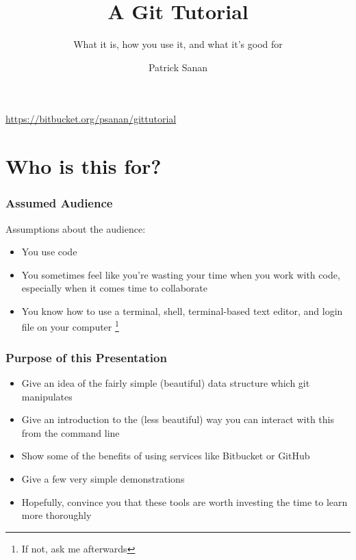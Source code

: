\documentclass{beamer}
\author{Patrick Sanan}
\institute[USI/ETHZ] 
{
USI Lugano ICS / ETH Z\"{u}rich D-ERDW\\
}
\title{A Git Tutorial}
\subtitle[]{What it is, how you use it, and what it's good for}
\date[]{}
\begin{document}

\begin{frame}[fragile]
\titlepage 
\begin{center}
\href{https://bitbucket.org/psanan/gittutorial}{https://bitbucket.org/psanan/gittutorial}
\end{center}
\end{frame}


\begin{frame}
\tableofcontents 
\end{frame}

\section{Who is this for?}
\begin{frame}[fragile]
\frametitle{Assumed Audience}
Assumptions about the audience:
\begin{itemize}
\item You use code
\item You sometimes feel like you're wasting your time when you work with code, especially when it comes time to collaborate
\item You know how to use a terminal, shell, terminal-based text editor, and login file on your computer \footnote{If not, ask me afterwards}
\end{itemize}
\end{frame}

\begin{frame}[fragile]
\frametitle{Purpose of this Presentation}
\begin{itemize}
\item Give an idea of the fairly simple (beautiful) data structure which git manipulates
\item Give an introduction to the (less beautiful) way you can interact with this from the command line
\item Show some of the benefits of using services like Bitbucket or GitHub
\item Give a few very simple demonstrations
\item Hopefully, convince you that these tools are worth investing the time to learn more thoroughly
\end{itemize}
\end{frame}
\end{document}
